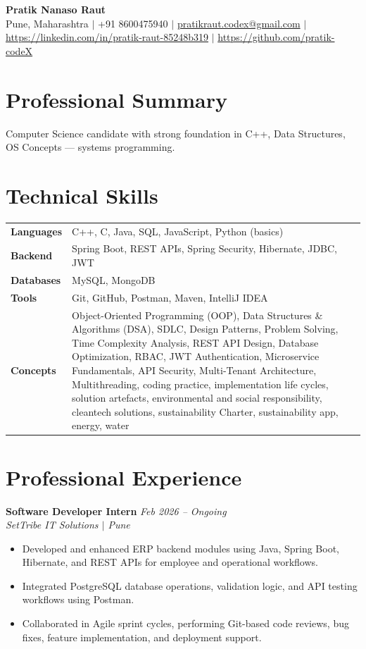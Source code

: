 \documentclass[10.5pt,a4paper]{article}
\begin{document}
\begin{center}
{\Large\bfseries Pratik Nanaso Raut}\\[2pt]
Pune, Maharashtra $|$ +91 8600475940 $|$ \href{mailto:pratikraut.codex@gmail.com}{pratikraut.codex@gmail.com} $|$ \href{https://linkedin.com/in/pratik-raut-85248b319}{https://linkedin.com/in/pratik-raut-85248b319} $|$ \href{https://github.com/pratik-codeX}{https://github.com/pratik-codeX}
\end{center}
\vspace{-2pt}
\section{Professional Summary}
Computer Science candidate with strong foundation in C++, Data Structures, OS Concepts — systems programming.
\section{Technical Skills}
\begin{tabular}{@{}p{}p{}@{}}
\textbf{Languages} & C++, C, Java, SQL, JavaScript, Python (basics) \\[1pt]
\textbf{Backend} & Spring Boot, REST APIs, Spring Security, Hibernate, JDBC, JWT \\[1pt]
\textbf{Databases} & MySQL, MongoDB \\[1pt]
\textbf{Tools} & Git, GitHub, Postman, Maven, IntelliJ IDEA \\[1pt]
\textbf{Concepts} & Object-Oriented Programming (OOP), Data Structures \& Algorithms (DSA), SDLC, Design Patterns, Problem Solving, Time Complexity Analysis, REST API Design, Database Optimization, RBAC, JWT Authentication, Microservice Fundamentals, API Security, Multi-Tenant Architecture, Multithreading, coding practice, implementation life cycles, solution artefacts, environmental and social responsibility, cleantech solutions, sustainability Charter, sustainability app, energy, water \\
\end{tabular}
\section{Professional Experience}
\textbf{Software Developer Intern} \hfill \textit{Feb 2026 -- Ongoing}
\\\textit{SetTribe IT Solutions $|$ Pune}
\begin{itemize}
  \item Developed and enhanced ERP backend modules using Java, Spring Boot, Hibernate, and REST APIs for employee and operational workflows.
  \item Integrated PostgreSQL database operations, validation logic, and API testing workflows using Postman.
  \item Collaborated in Agile sprint cycles, performing Git-based code reviews, bug fixes, feature implementation, and deployment support.
\end{itemize}
\end{document}
